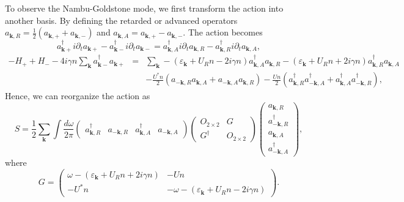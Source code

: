 \documentclass[aps,onecolumn,superscriptaddress,notitlepage,longbibliography]{revtex4-1}
\newcommand{\tmmathbf}[1]{\ensuremath{\boldsymbol{#1}}}
\begin{document}
To observe the Nambu-Goldstone mode, we first transform the action into
another basis. By defining the retarded or advanced operators
$a_{\tmmathbf{k}, R} = \frac{1}{2} (a_{\tmmathbf{k}, +} + a_{\tmmathbf{k},
-})$ and $a_{\tmmathbf{k}, A} = a_{\tmmathbf{k}, +} - a_{\tmmathbf{k}, -}$.
The action becomes
\[ a^{\dagger}_{\tmmathbf{k}+} i \partial_t a_{\tmmathbf{k}+} -
   a^{\dagger}_{\tmmathbf{k}-} i \partial_t a_{\tmmathbf{k}-} =
   a^{\dagger}_{\tmmathbf{k}, A} i \partial_t a_{\tmmathbf{k}, R} -
   a^{\dagger}_{\tmmathbf{k}, R} i \partial_t a_{\tmmathbf{k}, A}, \]
\begin{eqnarray*}
  - H_+ + H_- - 4 i \gamma n \sum_{\tmmathbf{k}} a_{\tmmathbf{k}-}^{\dagger}
  a_{\tmmathbf{k}+} & = & \sum_{\tmmathbf{k}} - (\varepsilon_{\tmmathbf{k}} +
  U_R n - 2 i \gamma n) a_{\tmmathbf{k}, A}^{\dagger} a_{\tmmathbf{k}, R} -
  (\varepsilon_{\tmmathbf{k}} + U_R n + 2 i \gamma n) a_{\tmmathbf{k},
  R}^{\dagger} a_{\tmmathbf{k}, A}\\
  &  & - \frac{U^{\ast} n}{2} (a_{- \tmmathbf{k}, R} a_{\tmmathbf{k}, A} +
  a_{- \tmmathbf{k}, A} a_{\tmmathbf{k}, R}) - \frac{U n}{2} (a_{\tmmathbf{k},
  R}^{\dagger} a^{\dagger}_{- \tmmathbf{k}, A} + a^{\dagger}_{\tmmathbf{k}, A}
  a^{\dagger}_{- \tmmathbf{k}, R}),
\end{eqnarray*}
Hence, we can reorganize the action as
\begin{equation}
  S = \frac{1}{2} \sum_{\tmmathbf{k}} \int \frac{d \omega}{2 \pi}
  \left(\begin{array}{cccc}
    a_{\tmmathbf{k}, R}^{\dagger} & a_{- \tmmathbf{k}, R} & a_{\tmmathbf{k},
    A}^{\dagger} & a_{- \tmmathbf{k}, A}
  \end{array}\right) \left(\begin{array}{cc}
    O_{2 \times 2} & G\\
    G^{\dagger} & O_{2 \times 2}
  \end{array}\right) \left(\begin{array}{c}
    a_{\tmmathbf{k}, R}\\
    a_{- \tmmathbf{k}, R}^{\dagger}\\
    a_{\tmmathbf{k}, A}\\
    a_{- \tmmathbf{k}, A}^{\dagger}
  \end{array}\right),
\end{equation}
where
\begin{equation}
  G = \left(\begin{array}{cc}
    \omega - (\varepsilon_{\tmmathbf{k}} + U_R n + 2 i \gamma n) & - U n\\
    - U^{\ast} n & - \omega - (\varepsilon_{\tmmathbf{k}} + U_R n - 2 i \gamma
    n)
  \end{array}\right) .
\end{equation}
\end{document}
